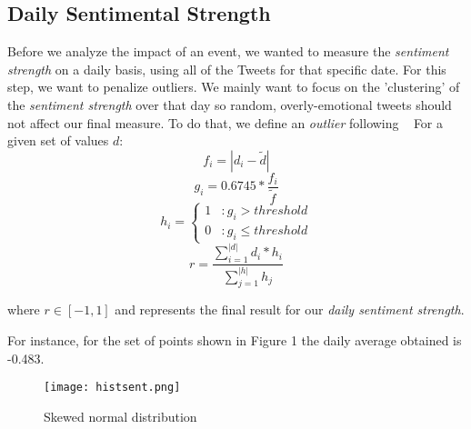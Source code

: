 \documentclass[11pt]{article}
\begin{document}
	\subsection{Daily Sentimental Strength}
	\label{sub:daily_sentiment_strength}
	Before we analyze the impact of an event, we wanted to measure the \textit{sentiment strength} on a daily basis, using all of the Tweets for that specific date. For this step, we want to penalize outliers. We mainly want to focus on the 'clustering' of the \textit{sentiment strength} over that day so random, overly-emotional tweets should not affect our final measure.
	To do that, we define an \textit{outlier} following ~\cite{cite22} For a given set of values $d$:
	\begin{equation}
	f_{i} = |d_{i} - \tilde{d}|
	\end{equation} 
	\begin{equation}
	g_{i} = 0.6745 * \frac{f_{i}}{\tilde{f}}
	\end{equation}
	\begin{equation}
	h_{i} = \left\{
	\begin{array}{lr}
	1 & : g_{i} > threshold\\
	0 & : g_{i} \leq threshold
	\end{array}
	\right.
	\end{equation}
	\begin{equation}
	r = \frac{\sum_{i=1}^{|d|} d_{i} * h_{i}}{\sum_{j=1}^{|h|} h_{j}}
	\end{equation} 
	
	where $r \in [-1, 1]$ and represents the final result for our \textit{daily sentiment strength}.

	For instance, for the set of points shown in Figure 1 the daily average obtained is -0.483.

	\begin{figure}[htp]
	    \centering
	    \texttt{[image: histsent.png]}
	    \caption{Skewed normal distribution}
	\end{figure}
\end{document}

